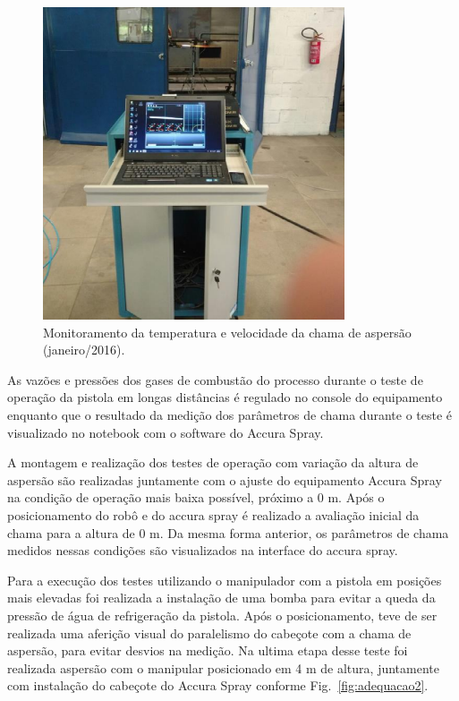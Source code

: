 \begin{figure}
	\centering
	\includegraphics[width=1\columnwidth]{method/figs/adequacao/adequacao1.png}
    \caption{Monitoramento da temperatura e velocidade da chama de aspersão (janeiro/2016).}
    \label{fig:adequacao1}
\end{figure}

As vazões e pressões dos gases de combustão do processo durante o teste de
operação da pistola em longas distâncias é regulado no console do equipamento
enquanto que o resultado da medição dos parâmetros de chama durante o teste é
visualizado no notebook com o software do Accura Spray.

A montagem e realização dos testes de operação com variação da altura de
aspersão são realizadas juntamente com o ajuste do equipamento Accura Spray na
condição de operação mais baixa possível, próximo a 0 m. Após o posicionamento
do robô e do accura spray é realizado a avaliação inicial da chama para a
altura de 0 m. Da mesma forma anterior, os parâmetros de chama medidos nessas
condições são visualizados na interface do accura spray.

Para a execução dos testes utilizando o manipulador com a pistola em posições
mais elevadas foi realizada a instalação de uma bomba para evitar a queda da
pressão de água de refrigeração da pistola. Após o posicionamento, teve de ser
realizada uma aferição visual do paralelismo do cabeçote com a chama de
aspersão, para evitar desvios na medição. Na ultima etapa desse teste foi
realizada aspersão com o manipular posicionado em 4 m de altura, juntamente com
instalação do cabeçote do Accura Spray conforme Fig.~\ref{fig:adequacao2}.


